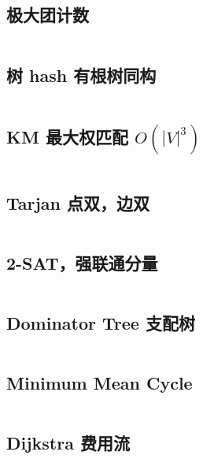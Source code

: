 \documentclass[titlepage, a4paper]{article}
\begin{document}
\begin{multicols}{2}
\begin{spacing}{0.6}
				\subsection{极大团计数}
				\inputminted{cpp}{src/TreeandGraph/CliqueCount.cpp}
				\subsection{树 hash 有根树同构}
				\inputminted{cpp}{src/TreeandGraph/TreeHash.cpp}
				\subsection{KM 最大权匹配 $O(|V|^3)$}
				\inputminted{cpp}{src/TreeandGraph/KM.cpp}
				\subsection{Tarjan 点双，边双}
				\inputminted{cpp}{src/TreeandGraph/Tarjan.cpp}
				\subsection{2-SAT，强联通分量}
				\inputminted{cpp}{src/TreeandGraph/2-sat.cpp}
				\subsection{Dominator Tree 支配树}
				\inputminted{cpp}{src/TreeandGraph/支配树.cpp}
				\subsection{Minimum Mean Cycle}
				\inputminted{cpp}{src/TreeandGraph/MeanCycle.cpp}
				\subsection{Dijkstra 费用流}
				\inputminted{cpp}{src/TreeandGraph/MCMF_dij.cpp}

\end{spacing}
\end{multicols}
\end{document}
